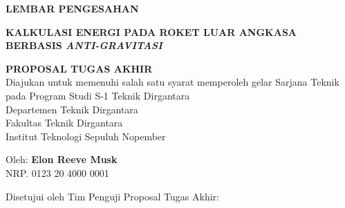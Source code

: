 \begin{center}
	\large
  \textbf{LEMBAR PENGESAHAN}
\end{center}

\thispagestyle{empty}

\begin{center}
  \textbf{KALKULASI ENERGI PADA ROKET LUAR ANGKASA BERBASIS \emph{ANTI-GRAVITASI}}
\end{center}

\begingroup
  \small

  \begin{center}
    \textbf{PROPOSAL TUGAS AKHIR} \\
    Diajukan untuk memenuhi salah satu syarat memperoleh gelar
    Sarjana Teknik pada 
    Program Studi S-1 Teknik Dirgantara \\
    Departemen Teknik Dirgantara \\
    Fakultas Teknik Dirgantara \\
    Institut Teknologi Sepuluh Nopember
  \end{center}

  \begin{center}
    Oleh: \textbf{Elon Reeve Musk} \\
    NRP. 0123 20 4000 0001
  \end{center}

  \begin{center}
    Disetujui oleh Tim Penguji Proposal Tugas Akhir:
  \end{center}

  \begingroup
    \setlength{\tabcolsep}{0pt}

